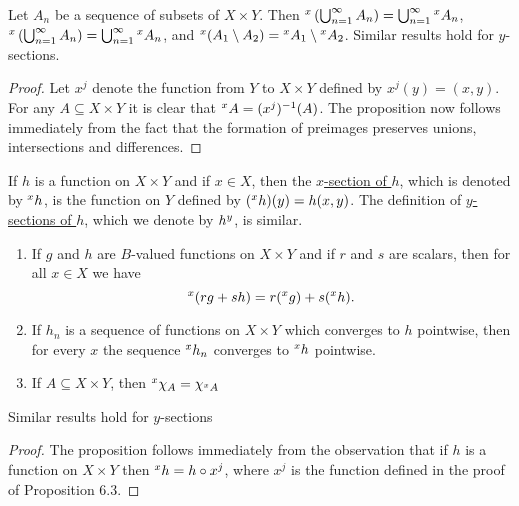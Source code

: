 \begin{proposition}
Let $A_n$ be a sequence of subsets of $X\times Y$. Then $\xsec{\br{\bigcup_{n=1}^\infty A_n}}{x}=\bigcup_{n=1}^\infty\xsec{A_n}{x}$, $\xsec{\br{\bigcup_{n=1}^\infty A_n}}{x}=\bigcup_{n=1}^\infty\xsec{A_n}{x}$, and $\xsec{(A_1\sd A_2)}{x}=\xsec{A_1}{x}\sd\xsec{A_2}{x}$. Similar results hold for $y$-sections.
\end{proposition}

\begin{proof}
Let $x^j$ denote the function from $Y$ to $X\times Y$ defined by $x^j(y)=(x, y)$. For any $A\subseteq X\times Y$ it is clear that $\xsec{A}{x}=(x^j)^{-1}(A)$. The proposition now follows immediately from the fact that the formation of preimages preserves unions, intersections and differences.
\end{proof}


\begin{definition}
If $h$ is a function on $X\times Y$ and if $x\in X$, then the \underline{$x$-section of $h$}, which is denoted by $\xsec{h}{x}$, is the function on $Y$ defined by $(\xsec{h}{x})(y)=h(x, y)$. The definition of \underline{$y$-sections of $h$}, which we denote by $\ysec{h}{y}$, is similar.
\end{definition}

\begin{proposition}
\begin{enumerate}
    \item If $g$ and $h$ are $B$-valued functions on $X\times Y$ and if $r$ and $s$ are scalars, then for all $x\in X$ we have $$\xsec{(rg+sh)}{x}=r(\xsec{g}{x})+s(\xsec{h}{x}).$$

    \item If $h_n$ is a sequence of functions on $X\times Y$ which converges to $h$ pointwise, then for every $x$ the sequence $\xsec{h_n}{x}$ converges to $\xsec{h}{x}$ pointwise.
    
    \item If $A\subseteq X\times Y$, then $\xsec{\idf{A}}{x}=\idf{\xsec{A}{x}}$
\end{enumerate}
Similar results hold for $y$-sections
\end{proposition}

\begin{proof}
The proposition follows immediately from the observation that if $h$ is a function on $X\times Y$ then $\xsec{h}{x}=h\circ x^j$, where $x^j$ is the function defined in the proof of Proposition 6.3.
\end{proof}

